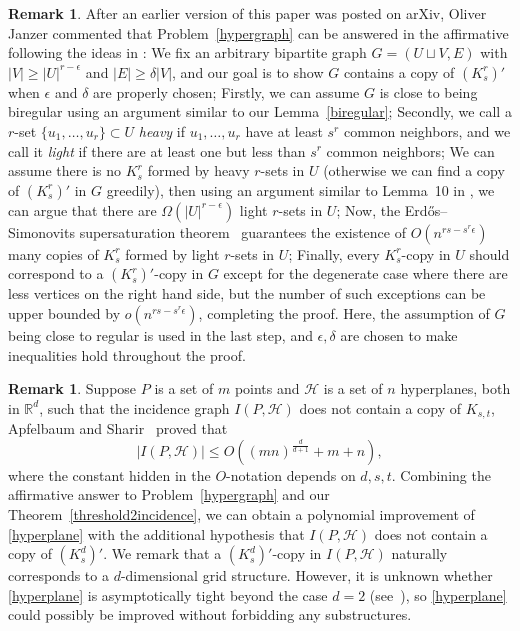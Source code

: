 \documentclass[11pt]{article}
\theoremstyle{definition}
\newtheorem{remark}[theorem]{Remark}
\begin{document}
\begin{remark}
    After an earlier version of this paper was posted on arXiv, Oliver Janzer commented that Problem~\ref{hypergraph} can be answered in the affirmative following the ideas in \cite{janzer2019improved}: We fix an arbitrary bipartite graph $G = (U \sqcup V, E)$ with $|V| \geq |U|^{r - \epsilon}$ and $|E| \geq \delta |V|$, and our goal is to show $G$ contains a copy of $(K_s^{r})'$ when $\epsilon$ and $\delta$ are properly chosen; Firstly, we can assume $G$ is close to being biregular using an argument similar to our Lemma~\ref{biregular}; Secondly, we call a $r$-set $\{u_1,\dots,u_r\} \subset U$ \textit{heavy} if $u_1,\dots,u_r$ have at least $s^r$ common neighbors, and we call it \textit{light} if there are at least one but less than $s^r$ common neighbors; We can assume there is no $K_s^r$ formed by heavy $r$-sets in $U$ (otherwise we can find a copy of $(K_s^{r})'$ in $G$ greedily), then using an argument similar to Lemma~10 in \cite{janzer2019improved}, we can argue that there are $\Omega(|U|^{r - \epsilon})$ light $r$-sets in $U$; Now, the Erd\H{o}s--Simonovits supersaturation theorem~\cite{erdHos1983supersaturated} guarantees the existence of $O(n^{rs - s^r\epsilon})$ many copies of $K_s^r$ formed by light $r$-sets in $U$; Finally, every $K_s^r$-copy in $U$ should correspond to a $(K_s^{r})'$-copy in $G$ except for the degenerate case where there are less vertices on the right hand side, but the number of such exceptions can be upper bounded by $o(n^{rs - s^r\epsilon})$, completing the proof. Here, the assumption of $G$ being close to regular is used in the last step, and $\epsilon,\delta$ are chosen to make inequalities hold throughout the proof.
\end{remark}

\begin{remark}
    Suppose $P$ is a set of $m$ points and $\mathcal{H}$ is a set of $n$ hyperplanes, both in $\mathbb{R}^d$, such that the incidence graph $I(P,\mathcal{H})$ does not contain a copy of $K_{s,t}$, Apfelbaum and Sharir~\cite{apfelbaum2007large} proved that\begin{equation}\label{hyperplane}
        |I(P,\mathcal{H})| \leq O\left( (mn)^{\frac{d}{d+1}} + m + n \right),
    \end{equation} where the constant hidden in the $O$-notation depends on $d,s,t$. Combining the affirmative answer to Problem~\ref{hypergraph} and our Theorem~\ref{threshold2incidence}, we can obtain a polynomial improvement of \eqref{hyperplane} with the additional hypothesis that $I(P,\mathcal{H})$ does not contain a copy of $(K_s^{d})'$. We remark that a $(K_s^{d})'$-copy in $I(P,\mathcal{H})$ naturally corresponds to a $d$-dimensional grid structure. However, it is unknown whether \eqref{hyperplane} is asymptotically tight beyond the case $d=2$ (see~\cite{sudakov2024evasive}), so \eqref{hyperplane} could possibly be improved without forbidding any substructures.
\end{remark}
\end{document}
